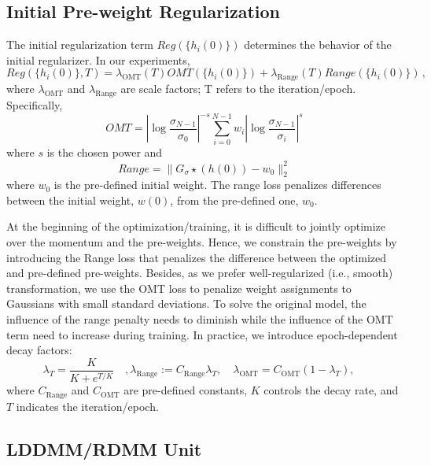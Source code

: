 \documentclass{article}
\numberwithin{equation}{section}
\newcommand{\ie}{{i.e.}}
\begin{document}
\subsection {Initial Pre-weight Regularization}\label{sec:initial_reg}
The initial regularization term ${Reg}(\{h_i(0)\})$ determines the behavior of the initial regularizer. In our experiments, 
\begin{equation}
    {Reg}(\{h_i(0)\},T) =\lambda_{\mathrm{OMT}}(T) {OMT}(\{h_i(0)\}) + \lambda_{\mathrm{Range}}(T){Range}(\{h_i(0)\})\, ,
\end{equation}
where $\lambda_{\mathrm{OMT}}$ and $\lambda_{\mathrm{Range}}$ are scale factors; T refers to the iteration/epoch. Specifically,
\begin{equation}
    {OMT}=\left|\log \frac{\sigma_{N-1}}{\sigma_{0}}\right|^{-s} \sum_{i=0}^{N-1} w_{i}\left|\log \frac{\sigma_{N-1}}{\sigma_{i}}\right|^{s}
\end{equation}
where $s$ is the chosen power and
\begin{equation}
    {Range}= \|G_{\sigma}\star(h(0))-w_0\|^2_2
\end{equation}
where $w_0$ is the pre-defined initial weight. The range loss penalizes differences between the initial weight, $w(0)$, from the pre-defined one, $w_0$.

At the beginning of the optimization/training, it is difficult to jointly optimize over the momentum and the pre-weights. Hence, we constrain the pre-weights by introducing the Range loss that penalizes the difference between the optimized and pre-defined pre-weights. Besides, as we prefer well-regularized (\ie, smooth) transformation, we use the OMT loss to penalize weight assignments to Gaussians with small standard deviations. To solve the original model, the influence of the range penalty needs to diminish while the influence of the OMT term need to increase during training. In practice, we introduce epoch-dependent decay factors:
 \begin{equation}
 \lambda_T = \frac{K}{K+e^{T/K}}\quad,
  \lambda_{\mathrm{Range}} := C_{\mathrm{Range}}\lambda_T ,\quad
  \lambda_{\mathrm{OMT}} =C_{\mathrm{OMT}}(1 -\lambda_T),\quad
\label{eq:regularization_penalty_weights}
\end{equation}
where $C_{\mathrm{Range}}$ and $C_{\mathrm{OMT}}$ are pre-defined constants, $K$ controls the decay rate, and $T$ indicates the iteration/epoch.



\subsection{LDDMM/RDMM Unit}
\label{sec:unit}
\end{document}

